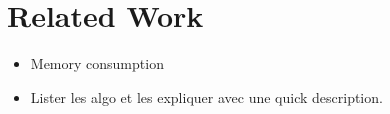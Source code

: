 \section{Related Work}
\begin{itemize}
	\item Memory consumption~\cite{memory_consumption_machine_learning}
\end{itemize}
\begin{itemize}
	\item Lister les algo et les expliquer avec une quick description.
\end{itemize}

